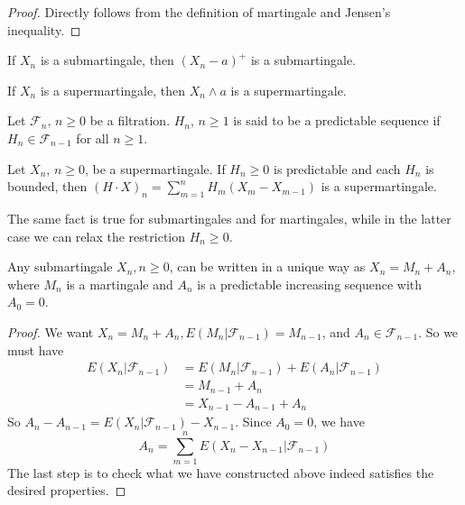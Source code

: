 \begin{proof}
Directly follows from the definition of martingale and Jensen's inequality.
\end{proof}
\begin{corollary}
If $X_n$ is a submartingale, then $(X_n-a)^+$ is a submartingale.
\end{corollary}
\begin{corollary}
If $X_n$ is a supermartingale, then $X_n\wedge a$ is a supermartingale.
\end{corollary}
\begin{definition}[predictable]
Let $\mathcal{F}_n$, $n\geq 0$ be a filtration. $H_n$, $n\geq 1$ is said to be a predictable sequence if $H_n\in\mathcal{F}_{n-1}$ for all $n\geq 1$.
\end{definition}
\begin{example}

\end{example}
\begin{theorem}
Let $X_n$, $n\geq 0$, be a supermartingale. If $H_n\ge0$ is predictable and each $H_n$ is bounded, then $(H\cdot X)_n=\sum_{m=1}^nH_m(X_m-X_{m-1})$ is a supermartingale. \par
The same fact is true for submartingales and for martingales, while in the latter case we can relax the restriction $H_n\ge0$.
\end{theorem}


\begin{theorem}
Any submartingale $X_n,n\geq 0$, can be written in a unique way as $X_n=M_n+A_n$, where $M_n$ is a martingale and $A_n$ is a predictable increasing sequence with $A_0=0$.
\end{theorem}
\begin{proof}
We want $X_n=M_n+A_n,E(M_n|\mathcal{F}_{n-1})=M_{n-1}$, and $A_n\in\mathcal{F}_{n-1}$. So we must have 
\begin{align*}
E(X_n|\mathcal{F}_{n-1})&=E(M_n|\mathcal{F}_{n-1})+E(A_n|\mathcal{F}_{n-1})\\
&=M_{n-1}+A_n\\
&=X_{n-1}-A_{n-1}+A_n
\end{align*}
So $A_n-A_{n-1}=E(X_n|\mathcal{F}_{n-1})-X_{n-1}$. Since $A_0=0$, we have \[A_n=\sum_{m=1}^nE(X_n-X_{n-1}|\mathcal{F}_{n-1})\]
The last step is to check what we have constructed above indeed satisfies the desired properties.
\end{proof}

